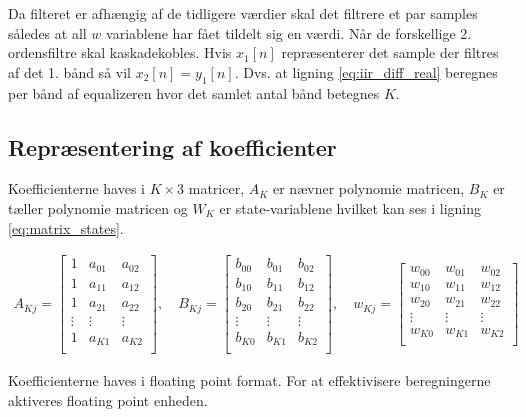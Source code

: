     Da filteret er afhængig af de tidligere værdier skal det filtrere et par samples således at all $w$ variablene 
    har fået tildelt sig en værdi.
Når de forskellige 2. ordensfiltre skal kaskadekobles. Hvis $x_{1}[n]$ repræsenterer det sample der filtres af det 1. bånd så vil $x_{2}[n] = y_{1}[n]$.
    Dvs. at ligning \ref{eq:iir_diff_real} beregnes per bånd af equalizeren hvor det samlet antal bånd betegnes $K$.\\
\subsection{Repræsentering af koefficienter}

    Koefficienterne haves i $K \times 3$ matricer,
    $A_K$ er nævner polynomie matricen, $B_K$ er tæller polynomie matricen
   og $W_K$ er state-variablene hvilket kan ses i ligning \ref{eq:matrix_states}.  

   \begin{align}
   A_{Kj} = \left[\begin{matrix}
   1 			& a_{01} 	& a_{02} \\
   1 			& a_{11} 	& a_{12} \\
   1 			& a_{21} 	& a_{22} \\
   \vdots 		& \vdots 	&  \vdots \\
   1 			& a_{K1} 	& a_{K2} \\
   \end{matrix}
   \right], \quad
      B_{Kj} = \left[\begin{matrix}
   b_{00}		& b_{01} 	& b_{02} \\
   b_{10}		& b_{11} 	& b_{12} \\
   b_{20}		& b_{21} 	& b_{22} \\
   \vdots 		& \vdots 	&  \vdots \\
   b_{K0}		& b_{K1} 	& b_{K2} \\
   \end{matrix}
   \right], \quad
      w_{Kj} = \left[\begin{matrix}
   w_{00}		& w_{01} 	& w_{02} \\
   w_{10}		& w_{11} 	& w_{12} \\
   w_{20}		& w_{21} 	& w_{22} \\
   \vdots 		& \vdots 	&  \vdots \\
   w_{K0}		& w_{K1} 	& w_{K2} \\
   \end{matrix}
   \right]
   \label{eq:matrix_states}
   \end{align}

   Koefficienterne haves i floating point format. For at effektivisere beregningerne aktiveres floating point 
   enheden. 
